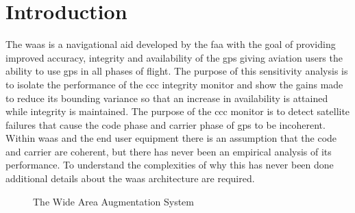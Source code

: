 \acresetall
\chapter{Introduction}
\label{chapter:introduction}

The \ac{waas} is a navigational aid developed by the \ac{faa} with the goal of providing improved accuracy, integrity and availability of the \ac{gps} giving aviation users the ability to use \ac{gps} in all phases of flight.  The purpose of this sensitivity analysis is to isolate the performance of the \ac{ccc} integrity monitor and show the gains made to reduce its bounding variance so that an increase in availability is attained while integrity is maintained. The purpose of the \ac{ccc} monitor is to detect satellite failures that cause the code phase and carrier phase of \ac{gps} to be incoherent.  Within \ac{waas} and the end user equipment there is an assumption that the code and carrier are coherent, but there has never been an empirical analysis of its performance.  To understand the complexities of why this has never been done additional details about the \ac{waas} architecture are required.

\begin{figure}
	\centering
	\caption{The Wide Area Augmentation System}
	\label{fig:WAAS-Overview-1}
\end{figure}

